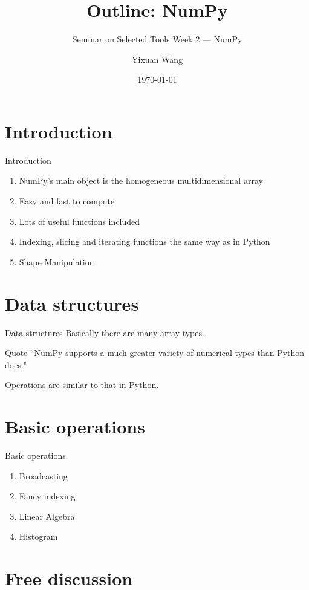 \documentclass[english, nochinese]{../TeXTemplate/pkuslide}
\title{Outline: NumPy}
\subtitle{Seminar on Selected Tools Week 2 --- NumPy}
\author{Yixuan Wang}
\date{\today}
\begin{document}
\begin{frame}
\titlepage
\end{frame}

\begin{frame}
\tableofcontents[subsectionstyle=hide]
\end{frame}

\section{Introduction}

\begin{frame}
\sectionpage
\end{frame}



\begin{frame}{Introduction}
\begin{enumerate}
\item NumPy’s main object is the homogeneous multidimensional array
\item Easy and fast to compute
\item Lots of useful functions included 
\item Indexing, slicing and iterating functions the same way as in Python 
\item Shape Manipulation 
\end{enumerate}
\end{frame}

\section{Data structures}

\begin{frame}
\sectionpage
\end{frame}

\begin{frame}{Data structures}
Basically there are many array types. 

Quote ``NumPy supports a much greater variety of numerical types than Python does."

Operations are similar to that in Python.
\end{frame}


\section{Basic operations}

\begin{frame}
\sectionpage
\end{frame}

\begin{frame}{Basic operations}
\begin{enumerate}
\item Broadcasting
\item Fancy indexing
\item Linear Algebra 
\item Histogram
\end{enumerate}
\end{frame}




\section{Free discussion}

\begin{frame}
\sectionpage
\end{frame}
\end{document}
